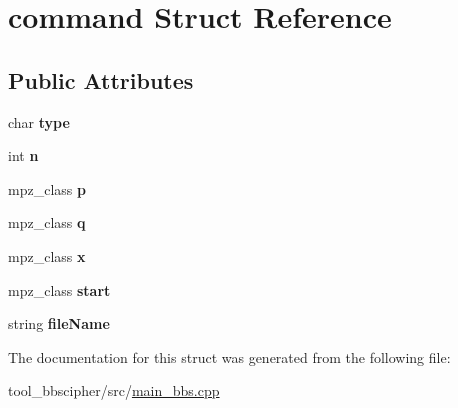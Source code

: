 \hypertarget{structcommand}{}\section{command Struct Reference}
\label{structcommand}
\subsection*{Public Attributes}
\begin{DoxyCompactItemize}
\item 
char {\bfseries type}\hypertarget{structcommand_aca360700676d2aafc00ecb5bbae7c462}{}\label{structcommand_aca360700676d2aafc00ecb5bbae7c462}

\item 
int {\bfseries n}\hypertarget{structcommand_a351a537eaebacbd1535b7ae42daf4570}{}\label{structcommand_a351a537eaebacbd1535b7ae42daf4570}

\item 
mpz\+\_\+class {\bfseries p}\hypertarget{structcommand_aed5e32759cc069c581bd4c0bca4fed3a}{}\label{structcommand_aed5e32759cc069c581bd4c0bca4fed3a}

\item 
mpz\+\_\+class {\bfseries q}\hypertarget{structcommand_a49204844a0803a91402583bc15a0f7c9}{}\label{structcommand_a49204844a0803a91402583bc15a0f7c9}

\item 
mpz\+\_\+class {\bfseries x}\hypertarget{structcommand_a11aa3ac35b7f88f07abd80d5bd4d88ca}{}\label{structcommand_a11aa3ac35b7f88f07abd80d5bd4d88ca}

\item 
mpz\+\_\+class {\bfseries start}\hypertarget{structcommand_a7d73e7c7fced7df60406c260656e18c1}{}\label{structcommand_a7d73e7c7fced7df60406c260656e18c1}

\item 
string {\bfseries file\+Name}\hypertarget{structcommand_a7bb7b02345814a65d8abdc177ed65afc}{}\label{structcommand_a7bb7b02345814a65d8abdc177ed65afc}

\end{DoxyCompactItemize}


The documentation for this struct was generated from the following file\+:\begin{DoxyCompactItemize}
\item 
tool\+\_\+bbscipher/src/\hyperlink{main__bbs_8cpp}{main\+\_\+bbs.\+cpp}\end{DoxyCompactItemize}
